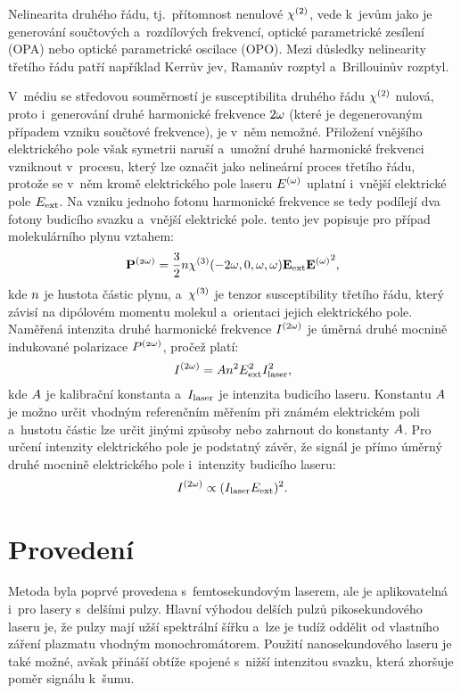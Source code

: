 Nelinearita druhého řádu, tj.~přítomnost nenulové $\chi^{(2)}$,
vede k~jevům jako je generování součtových a~rozdílových frekvencí,
optické parametrické zesílení (OPA) nebo optické parametrické oscilace (OPO).
Mezi důsledky nelinearity třetího řádu patří například
Kerrův jev, Ramanův rozptyl a~Brillouinův rozptyl.
\autocite{rpphotonics-polarization}

V~médiu se středovou souměrností je susceptibilita druhého řádu $\chi^{(2)}$
nulová, proto i~generování druhé harmonické frekvence $2\omega$
(které je degenerovaným případem vzniku součtové frekvence), je v~něm nemožné.
Přiložení vnějšího elektrického pole však symetrii naruší
a~umožní druhé harmonické frekvenci vzniknout v~procesu,
který lze označit jako nelineární proces třetího řádu,
protože se v~něm kromě elektrického pole laseru $E^{(\mathnormal{\omega})}$ uplatní
i~vnější elektrické pole $E_\text{ext}$.
Na vzniku jednoho fotonu harmonické frekvence se tedy podílejí
dva fotony budicího svazku a~vnější elektrické pole.
 tento jev popisuje pro případ molekulárního plynu
vztahem:
\begin{equation}
	\label{eq:efishth-epolsh}
	\mathbf{P^{\mathnormal{(2\omega)}}} = \frac{3}{2} n \chi^{(3)}
	(-2\omega, 0, \omega, \omega)
	\mathbf{E_\text{ext}} \mathbf{E^{(\mathnormal{\omega})}}^2,
\end{equation}
kde $n$ je hustota částic plynu,
a~$\chi^{(3)}$ je tenzor susceptibility třetího řádu, který závisí
na dipólovém momentu molekul a~orientaci jejich elektrického pole.
\autocite{efish-2018}
Naměřená intenzita druhé harmonické frekvence $I^{(2\omega)}$
je úměrná druhé mocnině indukované polarizace $P^{\mathnormal{(2\omega)}}$, pročež platí:
\begin{equation}
	\label{eq:efishth-ity}
	I^{(2\omega)} = A n^2 E_\text{ext}^2 I_\text{laser}^2,
\end{equation}
kde $A$ je kalibrační konstanta
a~$I_\text{laser}$ je intenzita budicího laseru.
\autocite{efish-2018}
Konstantu $A$ je možno určit vhodným referenčním měřením
při známém elektrickém poli
a~hustotu částic lze určit jinými způsoby nebo zahrnout
do konstanty $A$.
Pro určení intenzity elektrického pole je podstatný závěr,
že signál \EFISH{} je přímo úměrný druhé mocnině elektrického pole
i~intenzity budicího laseru:
\begin{equation}
	\label{eq:efishth-prop-simple}
	I^{(2\omega)} \propto (I_\text{laser} E_\text{ext})^2.
\end{equation}

\section{Provedení}
\label{sec:efishth-setup}
Metoda \EFISH{} byla poprvé provedena s~femtosekundovým laserem,
ale je aplikovatelná i~pro lasery s~delšími pulzy.
Hlavní výhodou delších pulzů pikosekundového laseru je,
že pulzy mají užší spektrální šířku a~lze je tudíž oddělit
od vlastního záření plazmatu vhodným monochromátorem.
Použití nanosekundového laseru je také možné, avšak přináší obtíže
spojené s~nižší intenzitou svazku, která zhoršuje poměr signálu k~šumu.

